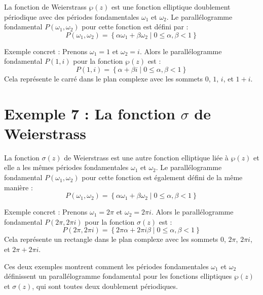 \documentclass[12pt]{article}
\begin{document}
 La fonction de Weierstrass \(\wp(z)\) est une fonction elliptique doublement périodique avec des périodes fondamentales \(\omega_1\) et \(\omega_2\). Le parallélogramme fondamental \(P(\omega_1, \omega_2)\) pour cette fonction est défini par :
 \[ P(\omega_1, \omega_2) = \left\{ \alpha \omega_1 + \beta \omega_2 \mid 0 \leq \alpha, \beta < 1 \right\} \]
 
 Exemple concret : Prenons \(\omega_1 = 1\) et \(\omega_2 = i\). Alors le parallélogramme fondamental \(P(1, i)\) pour la fonction \(\wp(z)\) est :
 \[ P(1, i) = \left\{ \alpha + \beta i \mid 0 \leq \alpha, \beta < 1 \right\} \]
 Cela représente le carré dans le plan complexe avec les sommets \(0\), \(1\), \(i\), et \(1 + i\).
 
 \section*{\textbf{Exemple 7 :} La fonction \(\sigma\) de Weierstrass}
 
 La fonction \(\sigma(z)\) de Weierstrass est une autre fonction elliptique liée à \(\wp(z)\) et elle a les mêmes périodes fondamentales \(\omega_1\) et \(\omega_2\). Le parallélogramme fondamental \(P(\omega_1, \omega_2)\) pour cette fonction est également défini de la même manière :
 \[ P(\omega_1, \omega_2) = \left\{ \alpha \omega_1 + \beta \omega_2 \mid 0 \leq \alpha, \beta < 1 \right\} \]
 
 Exemple concret : Prenons \(\omega_1 = 2\pi\) et \(\omega_2 = 2\pi i\). Alors le parallélogramme fondamental \(P(2\pi, 2\pi i)\) pour la fonction \(\sigma(z)\) est :
 \[ P(2\pi, 2\pi i) = \left\{ 2\pi \alpha + 2\pi i \beta \mid 0 \leq \alpha, \beta < 1 \right\} \]
 Cela représente un rectangle dans le plan complexe avec les sommets \(0\), \(2\pi\), \(2\pi i\), et \(2\pi + 2\pi i\).
 
 Ces deux exemples montrent comment les périodes fondamentales \(\omega_1\) et \(\omega_2\) définissent un parallélogramme fondamental pour les fonctions elliptiques \(\wp(z)\) et \(\sigma(z)\), qui sont toutes deux doublement périodiques.
\end{document}
